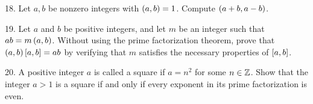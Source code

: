 \begin{mdframed}[style=darkAnswer,frametitle={Joe Starr}]
    
\end{mdframed}
\newpage
\begin{mdframed}[style=darkQuesion]
18. Let $a,b$ be nonzero integers with $\left(a,b\right)=1$. Compute $\left(a+b,a-b\right)$. 
\end{mdframed}

\begin{mdframed}[style=darkAnswer,frametitle={Joe Starr}]
    
\end{mdframed}
\newpage
\begin{mdframed}[style=darkQuesion]
19. Let $a$ and $b$ be positive integers, and let $m$ be an integer such that 
$ab=m\left(a,b\right)$. Without using the prime factorization theorem, prove that 
$\left(a,b\right)\left[a,b\right]=ab$ by verifying that $m$ satisfies the necessary properties
of $\left[a,b\right]$.
\end{mdframed}

\begin{mdframed}[style=darkAnswer,frametitle={Joe Starr}]
    
\end{mdframed}
\newpage
\begin{mdframed}[style=darkQuesion]
20. A positive integer $a$ is called a square if $a=n^2$ for some $n\in \mathbb{Z}$. 
Show that the integer $a>1$ is a square if and only if every exponent in its 
prime factorization is even. 
\end{mdframed}

